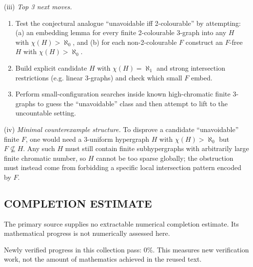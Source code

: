 (iii) \emph{Top 3 next moves.}
\begin{enumerate}
\item Test the conjectural analogue ``unavoidable iff 2-colourable'' by attempting: (a) an embedding lemma for every finite 2-colourable 3-graph into any $H$ with $\chi(H)>\aleph_0$, and (b) for each non-2-colourable $F$ construct an $F$-free $H$ with $\chi(H)>\aleph_0$.
\item Build explicit candidate $H$ with $\chi(H)=\aleph_1$ and strong intersection restrictions (e.g. linear 3-graphs) and check which small $F$ embed.
\item Perform small-configuration searches inside known high-chromatic finite 3-graphs to guess the ``unavoidable'' class and then attempt to lift to the uncountable setting.
\end{enumerate}

(iv) \emph{Minimal counterexample structure.}
To disprove a candidate ``unavoidable'' finite $F$, one would need a 3-uniform hypergraph $H$ with $\chi(H)>\aleph_0$ but $F\not\subseteq H$.
Any such $H$ must still contain finite subhypergraphs with arbitrarily large finite chromatic number, so $H$ cannot be too sparse globally; the obstruction must instead come from forbidding a specific local intersection pattern encoded by $F$.




\subsection*{COMPLETION ESTIMATE}
The primary source supplies no extractable numerical completion estimate. Its mathematical progress is not numerically assessed here.

Newly verified progress in this collection pass: $0\%$. This measures new verification work, not the amount of mathematics achieved in the reused text.
